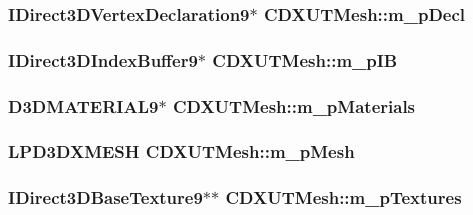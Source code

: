 \label{class_c_d_x_u_t_mesh_ad63cb9f8b37ad5f2d0b025814d316387}
\hypertarget{class_c_d_x_u_t_mesh_af276ff015c17baade93c1f837a1a4c6e}{
\subsubsection[{m\_\-pDecl}]{\setlength{\rightskip}{0pt plus 5cm}IDirect3DVertexDeclaration9$\ast$ {\bf CDXUTMesh::m\_\-pDecl}}}
\label{class_c_d_x_u_t_mesh_af276ff015c17baade93c1f837a1a4c6e}
\hypertarget{class_c_d_x_u_t_mesh_a588e11622970e060a5a8ce5359ae7429}{
\subsubsection[{m\_\-pIB}]{\setlength{\rightskip}{0pt plus 5cm}IDirect3DIndexBuffer9$\ast$ {\bf CDXUTMesh::m\_\-pIB}}}
\label{class_c_d_x_u_t_mesh_a588e11622970e060a5a8ce5359ae7429}
\hypertarget{class_c_d_x_u_t_mesh_aa8a024428991c0c72f485982862a5a05}{
\subsubsection[{m\_\-pMaterials}]{\setlength{\rightskip}{0pt plus 5cm}D3DMATERIAL9$\ast$ {\bf CDXUTMesh::m\_\-pMaterials}}}
\label{class_c_d_x_u_t_mesh_aa8a024428991c0c72f485982862a5a05}
\hypertarget{class_c_d_x_u_t_mesh_af002b74bd049bb0bfd920332c0e04a98}{
\subsubsection[{m\_\-pMesh}]{\setlength{\rightskip}{0pt plus 5cm}LPD3DXMESH {\bf CDXUTMesh::m\_\-pMesh}}}
\label{class_c_d_x_u_t_mesh_af002b74bd049bb0bfd920332c0e04a98}
\hypertarget{class_c_d_x_u_t_mesh_a916868603f58f3d35c52a788f1a7075f}{
\subsubsection[{m\_\-pTextures}]{\setlength{\rightskip}{0pt plus 5cm}IDirect3DBaseTexture9$\ast$$\ast$ {\bf CDXUTMesh::m\_\-pTextures}}}
